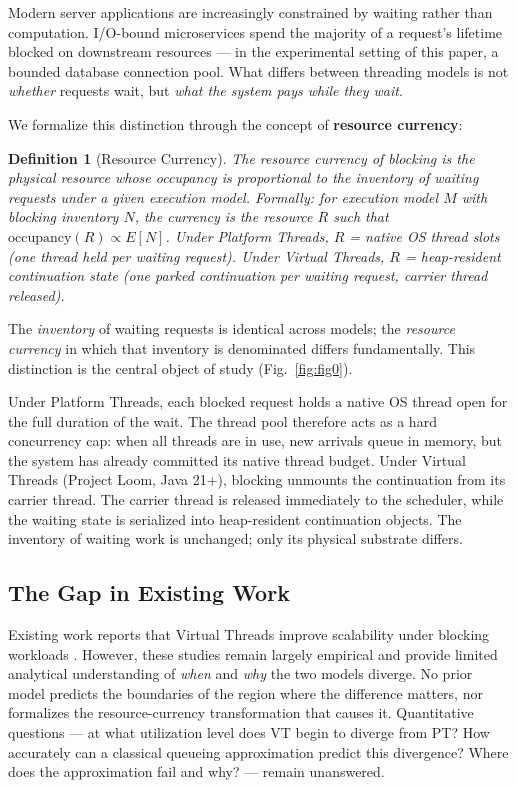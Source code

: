 \documentclass[10pt]{article}
\newtheorem{definition}{Definition}
\begin{document}
Modern server applications are increasingly constrained by waiting rather than computation. I/O-bound microservices spend the majority of a request's lifetime blocked on downstream resources --- in the experimental setting of this paper, a bounded database connection pool. What differs between threading models is not \emph{whether} requests wait, but \emph{what the system pays while they wait}.

We formalize this distinction through the concept of \textbf{resource currency}:

\begin{definition}[Resource Currency]
The resource currency of blocking is the physical resource whose occupancy is proportional to the inventory of waiting requests under a given execution model. Formally: for execution model $M$ with blocking inventory $N$, the currency is the resource $R$ such that $\mathrm{occupancy}(R) \propto E[N]$. Under Platform Threads, $R$ = native OS thread slots (one thread held per waiting request). Under Virtual Threads, $R$ = heap-resident continuation state (one parked continuation per waiting request, carrier thread released).
\end{definition}

The \emph{inventory} of waiting requests is identical across models; the \emph{resource currency} in which that inventory is denominated differs fundamentally. This distinction is the central object of study (Fig.~\ref{fig:fig0}).

Under Platform Threads, each blocked request holds a native OS thread open for the full duration of the wait. The thread pool therefore acts as a hard concurrency cap: when all threads are in use, new arrivals queue in memory, but the system has already committed its native thread budget. Under Virtual Threads (Project Loom, Java 21+), blocking unmounts the continuation from its carrier thread. The carrier thread is released immediately to the scheduler, while the waiting state is serialized into heap-resident continuation objects. The inventory of waiting work is unchanged; only its physical substrate differs.

\subsection{The Gap in Existing Work}

Existing work reports that Virtual Threads improve scalability under blocking workloads \cite{charlak2026,lasic2024,pufek2020,beronic2024,hu2026,ponnampalam2025}. However, these studies remain largely empirical and provide limited analytical understanding of \emph{when} and \emph{why} the two models diverge. No prior model predicts the boundaries of the region where the difference matters, nor formalizes the resource-currency transformation that causes it. Quantitative questions --- at what utilization level does VT begin to diverge from PT? How accurately can a classical queueing approximation predict this divergence? Where does the approximation fail and why? --- remain unanswered.
\end{document}
